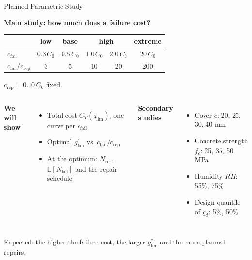 \begin{frame}{Planned Parametric Study}

\justifying

\textbf{Main study: how much does a failure cost?}

\vspace{0.15cm}

\centering
\begin{tabular}{@{}lccccc@{}}
\toprule
 & \textbf{low} & \textbf{base} & \multicolumn{2}{c}{\textbf{high}} & \textbf{extreme} \\ \midrule
$c_\mathrm{fail}$ & $0.3\, C_0$ & $0.5\, C_0$ & $1.0\, C_0$ & $2.0\, C_0$ & $20\, C_0$ \\
$c_\mathrm{fail} / c_\mathrm{rep}$ & 3 & 5 & 10 & 20 & 200 \\ \bottomrule
\end{tabular}

{\scriptsize $c_\mathrm{rep} = 0.10\, C_0$ fixed.}

\vspace{0.3cm}

\raggedright
\begin{columns}[T,onlytextwidth]
  \textbf{We will show}
  \begin{itemize}
    \item Total cost $C_T(g_\mathrm{lim})$, one curve per $c_\mathrm{fail}$
    \item Optimal $g^{\ast}_\mathrm{lim}$ vs. $c_\mathrm{fail}/c_\mathrm{rep}$
    \item At the optimum: $N_\mathrm{rep}$, $\mathbb{E}[N_\mathrm{fail}]$ and the repair schedule
  \end{itemize}

  \textbf{Secondary studies}
  \begin{itemize}
    \item Cover $c$: 20, 25, 30, 40 mm
    \item Concrete strength $f_c$: 25, 35, 50 MPa
    \item Humidity $RH$: 55\%, 75\%
    \item Design quantile of $g_d$: 5\%, 50\%
  \end{itemize}
\end{columns}

\vspace{0.2cm}

{\small Expected: the higher the failure cost, the larger $g^{\ast}_\mathrm{lim}$ and the more planned repairs.}

\end{frame}
